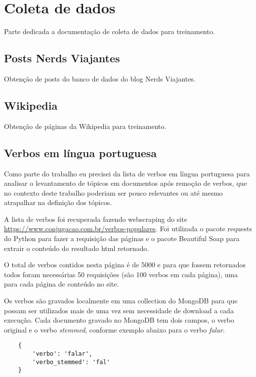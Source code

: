 \section{Coleta de dados}

Parte dedicada a documentação de coleta de dados para treinamento.

\subsection{Posts Nerds Viajantes}

Obtenção de posts do banco de dados do blog Nerds Viajantes.

\subsection{Wikipedia}

Obtenção de páginas da Wikipedia para treinamento.

\subsection{Verbos em língua portuguesa}

Como parte do trabalho eu precisei da lista de verbos em língua portuguesa para analisar o levantamento de tópicos em documentos após remoção de verbos, 
que no contexto deste trabalho poderiam ser pouco relevantes ou até mesmo atrapalhar na definição dos tópicos.

A lista de verbos foi recuperada fazendo webscraping do site \url{https://www.conjugacao.com.br/verbos-populares}. Foi utilizada o pacote requests do Python 
para fazer a requisição das páginas e o pacote Beautiful Soap para extrair o conteúdo do resultado html retornado.

O total de verbos contidos nesta página é de 5000 e para que fossem retornados todos foram necessárias 50 requisições (são 100 verbos em cada página), 
uma para cada página de conteúdo no site.

Os verbos são gravados localmente em uma collection do MongoDB para que possam ser utilizados mais de uma vez sem necessidade de download a cada execução.
Cada documento gravado no MongoDB tem dois campos, o verbo original e o verbo \textit{stemmed}, conforme exemplo abaixo para o verbo \textit{falar}.

\begin{lstlisting}
    {
        'verbo': 'falar',
        'verbo_stemmed': 'fal'
    }
\end{lstlisting}

\begin{comment}
\subsection{Melhores Destinos}

Obtenção de posts com conteúdo de promoções do blog Melhores Destinos.    
\end{comment}
